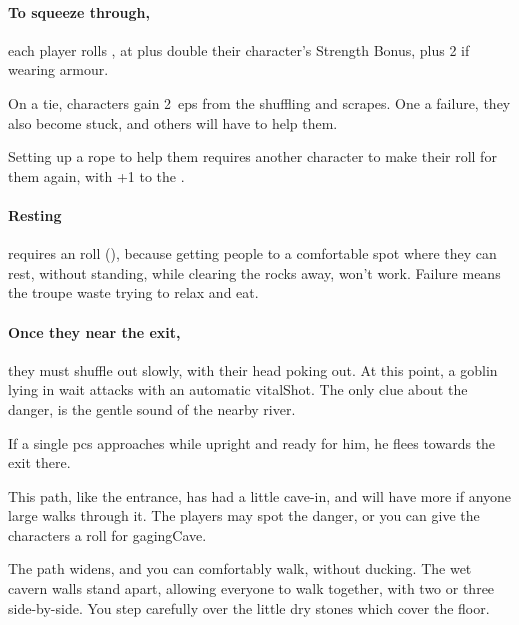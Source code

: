 \begin{multicols}{2}
\paragraph{To squeeze through,}
each player rolls , at \tn[7] plus double their character's Strength Bonus, plus 2 if wearing armour.

On a tie, characters gain 2~\glspl{ep} from the shuffling and scrapes.
One a failure, they also become stuck, and others will have to help them.

Setting up a rope to help them requires another character to make their roll for them again, with +1 to the .


\paragraph{Resting}
requires an  roll (\tn[10]), because getting people to a comfortable spot where they can rest, without standing, while clearing the rocks away, won't work.
Failure means the troupe waste  trying to relax and eat.

\paragraph{Once they near the exit,}
they must shuffle out slowly, with their head poking out.
At this point, a goblin lying in wait attacks with an automatic \gls{vitalShot}.
The only clue about the danger, is the gentle sound of the nearby river.

If a single \glspl{pc} approaches while upright and ready for him, he flees towards the exit there.

\playCommentaryPuddle


This path, like the entrance, has had a little cave-in, and will have more if anyone large walks through it.
The players may spot the danger, or you can give the characters a roll for \gls{gagingCave}.

\begin{boxtext}
  The path widens, and you can comfortably walk, without ducking.
  The wet cavern walls stand apart, allowing everyone to walk together, with two or three side-by-side.
  You step carefully over the little dry stones which cover the floor.
\end{boxtext}


\end{multicols}
